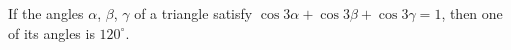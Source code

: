 If the angles $\alpha$, $\beta$, $\gamma$ of a triangle satisfy $\cos 3\alpha + \cos 3\beta + \cos 3\gamma = 1$, then one of its angles is $120^\circ$.
